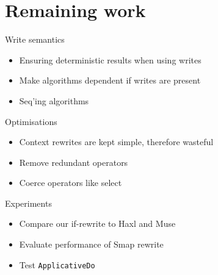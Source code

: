 \section{Remaining work}\label{remaining-work}

\begin{frame}{Write semantics}

\begin{itemize}[<+->]
\tightlist
\item
  Ensuring deterministic results when using writes
\item
  Make algorithms dependent if writes are present
\item
  Seq'ing algorithms
\end{itemize}

\end{frame}

\begin{frame}{Optimisations}

\begin{itemize}[<+->]
\tightlist
\item
  Context rewrites are kept simple, therefore wasteful
\item
  Remove redundant operators
\item
  Coerce operators like select
\end{itemize}

\end{frame}

\begin{frame}[fragile]{Experiments}

\begin{itemize}[<+->]
\tightlist
\item
  Compare our if-rewrite to Haxl and Muse
\item
  Evaluate performance of Smap rewrite
\item
  Test \texttt{ApplicativeDo}
\end{itemize}

\end{frame}
